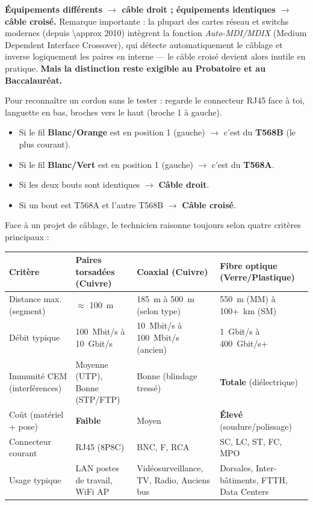 \documentclass[11pt]{article}
\newcounter{popsec}
\newcounter{popsub}
\newcommand{\courssub}[1]{%
  \stepcounter{popsub}%
  \par\vspace{9pt}\noindent{\popxbold\fontsize{11.5}{13}\selectfont\color{popink}{\color{poporange}\thepopsec.\thepopsub}\hspace{6pt}#1}\par\nopagebreak\vspace{4pt}
}
\begin{document}
\begin{aretenir}
\textbf{Équipements différents $\rightarrow$ câble droit ; équipements identiques $\rightarrow$ câble croisé.}
Remarque importante : la plupart des cartes réseau et switchs modernes (depuis \SI{\approx 2010}{}) intègrent la fonction \emph{Auto-MDI/MDIX} (Medium Dependent Interface Crossover), qui détecte automatiquement le câblage et inverse logiquement les paires en interne — le câble croisé devient alors inutile en pratique. \textbf{Mais la distinction reste exigible au Probatoire et au Baccalauréat.}
\end{aretenir}

\begin{exemplebox}
Pour reconnaître un cordon sans le tester : regarde le connecteur RJ45 face à toi, languette en bas, broches vers le haut (broche 1 à gauche).
\begin{itemize}
  \item Si le fil \textbf{Blanc/Orange} est en position 1 (gauche) $\rightarrow$ c'est du \textbf{T568B} (le plus courant).
  \item Si le fil \textbf{Blanc/Vert} est en position 1 (gauche) $\rightarrow$ c'est du \textbf{T568A}.
  \item Si les deux bouts sont identiques $\rightarrow$ \textbf{Câble droit}.
  \item Si un bout est T568A et l'autre T568B $\rightarrow$ \textbf{Câble croisé}.
\end{itemize}
\end{exemplebox}

\courssub{Critères de choix d'un câble}

Face à un projet de câblage, le technicien raisonne toujours selon quatre critères principaux :

\begin{center}
\begin{tabularx}{\linewidth}{|l|X|X|X|}
\hline
\rowcolor{popblueL} \textbf{Critère} & \textbf{Paires torsadées (Cuivre)} & \textbf{Coaxial (Cuivre)} & \textbf{Fibre optique (Verre/Plastique)} \\
\hline
Distance max. (segment) & $\approx$ \SI{100}{m} & \SI{185}{m} à \SI{500}{m} (selon type) & \SI{550}{m} (MM) à \SI{100+}{km} (SM) \\
\hline
Débit typique & \SI{100}{Mbit/s} à \SI{10}{Gbit/s} & \SI{10}{Mbit/s} à \SI{100}{Mbit/s} (ancien) & \SI{1}{Gbit/s} à \SI{400}{Gbit/s}+ \\
\hline
Immunité CEM (interférences) & Moyenne (UTP), Bonne (STP/FTP) & Bonne (blindage tressé) & \textbf{Totale} (diélectrique) \\
\hline
Coût (matériel + pose) & \textbf{Faible} & Moyen & \textbf{Élevé} (soudure/polissage) \\
\hline
Connecteur courant & RJ45 (8P8C) & BNC, F, RCA & SC, LC, ST, FC, MPO \\
\hline
Usage typique & LAN postes de travail, WiFi AP & Vidéosurveillance, TV, Radio, Anciens bus & Dorsales, Inter-bâtiments, FTTH, Data Centers \\
\hline
\end{tabularx}
\end{center}
\end{document}
